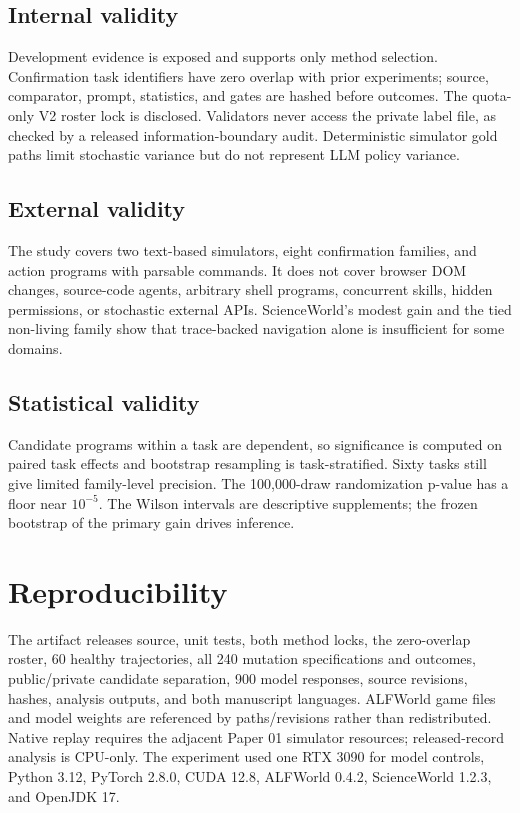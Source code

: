 \documentclass[pdflatex,sn-basic]{sn-jnl}
\begin{document}
\subsection{Internal validity}
Development evidence is exposed and supports only method selection. Confirmation task identifiers have zero overlap with prior experiments; source, comparator, prompt, statistics, and gates are hashed before outcomes. The quota-only V2 roster lock is disclosed. Validators never access the private label file, as checked by a released information-boundary audit. Deterministic simulator gold paths limit stochastic variance but do not represent LLM policy variance.

\subsection{External validity}
The study covers two text-based simulators, eight confirmation families, and action programs with parsable commands. It does not cover browser DOM changes, source-code agents, arbitrary shell programs, concurrent skills, hidden permissions, or stochastic external APIs. ScienceWorld's modest gain and the tied non-living family show that trace-backed navigation alone is insufficient for some domains.

\subsection{Statistical validity}
Candidate programs within a task are dependent, so significance is computed on paired task effects and bootstrap resampling is task-stratified. Sixty tasks still give limited family-level precision. The 100,000-draw randomization p-value has a floor near $10^{-5}$. The Wilson intervals are descriptive supplements; the frozen bootstrap of the primary gain drives inference.

\section{Reproducibility}
The artifact releases source, unit tests, both method locks, the zero-overlap roster, 60 healthy trajectories, all 240 mutation specifications and outcomes, public/private candidate separation, 900 model responses, source revisions, hashes, analysis outputs, and both manuscript languages. ALFWorld game files and model weights are referenced by paths/revisions rather than redistributed. Native replay requires the adjacent Paper 01 simulator resources; released-record analysis is CPU-only. The experiment used one RTX 3090 for model controls, Python 3.12, PyTorch 2.8.0, CUDA 12.8, ALFWorld 0.4.2, ScienceWorld 1.2.3, and OpenJDK 17.
\end{document}
